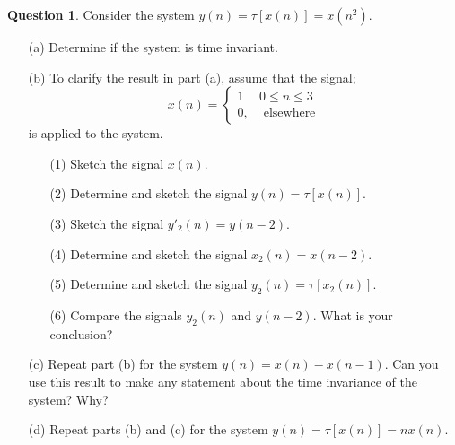 \documentclass[12pt]{article}
\theoremstyle{definition}
\newtheorem{question}{Question}
\begin{document}
\begin{question}
    Consider the system $y(n) = \tau[x(n)] = x(n^2)$.
    \begin{enumerate}
        \item[(a)] Determine if the system is time invariant.
        \item[(b)] To clarify the result in part (a), assume that the signal;
        $$
        x(n) = \begin{cases}
            1 & 0 \leq n \leq 3\\
            0, & \text{ elsewhere}
        \end{cases}
        $$  
        is applied to the system.
        \begin{enumerate}
            \item[(1)] Sketch the signal $x(n)$.
            \item[(2)] Determine and sketch the signal $y(n) = \tau[x(n)]$.
            \item[(3)] Sketch the signal $y'_2(n) = y(n-2)$.
            \item[(4)] Determine and sketch the signal $x_2(n) = x(n-2)$.
            \item[(5)] Determine and sketch the signal $y_2(n) = \tau[x_2(n)]$.
            \item[(6)] Compare the signals $y_2(n)$ and $y(n-2)$. What is your conclusion?
        \end{enumerate}
        \item[(c)] Repeat part (b) for the system $y(n) = x(n) - x(n-1)$. Can you use this result to make any statement about the time invariance of the system? Why?
        \item[(d)] Repeat parts (b) and (c) for the system $y(n) = \tau[x(n)] = nx(n)$. 
    \end{enumerate}
\end{question}
\end{document}
